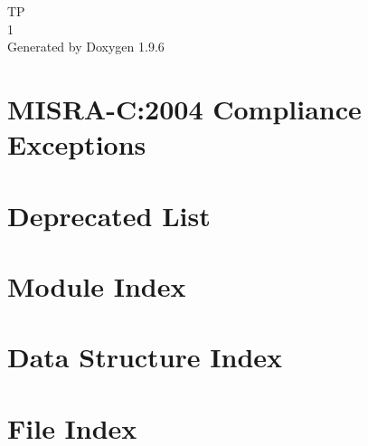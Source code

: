 \documentclass[twoside]{book}
\newcommand{\+}{\discretionary{\mbox{\scriptsize$\hookleftarrow$}}{}{}}
\newcommand{\clearemptydoublepage}{%
    \newpage{\pagestyle{empty}\cleardoublepage}%
  }
\begin{document}
  \raggedbottom
  \begin{titlepage}
  \vspace*{7cm}
  \begin{center}%
  {\Large TP}\\
  [1ex]\large 1 \\
  \vspace*{1cm}
  {\large Generated by Doxygen 1.9.6}\\
  \end{center}
  \end{titlepage}
  \clearemptydoublepage
  \tableofcontents
  \clearemptydoublepage
\chapter{MISRA-\/C\+:2004 Compliance Exceptions}
\label{_c_m_s_i_s__m_i_s_r_a__exceptions}

\chapter{Deprecated List}
\label{deprecated}

\chapter{Module Index}

\chapter{Data Structure Index}

\chapter{File Index}

\end{document}

